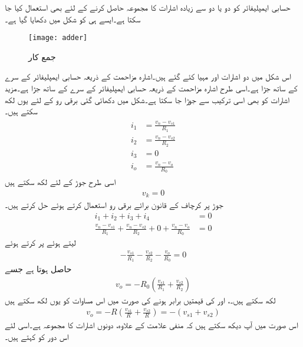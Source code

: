 
حسابی ایمپلیفائر کو دو یا دو سے زیادہ اشارات کا مجموعہ حاصل کرنے کے لئے بھی استعمال کیا جا سکتا ہے۔ایسے ہی   کو شکل  میں دکھایا گیا ہے۔
\begin{figure}
\centering
\texttt{[image: adder]}
\caption{جمع کار}
\label{شکل_جمع_کار}
\end{figure}
	اس شکل میں دو اشارات  اور  مہیا کئے گئے ہیں۔اشارہ  مزاحمت  کے ذریعہ حسابی ایمپلیفائر کے  سرے کے ساتھ جڑا ہے۔اسی طرح اشارہ  مزاحمت  کے ذریعہ حسابی ایمپلیفائر کے  سرے کے ساتھ جڑا ہے۔مزید اشارات کو بھی اسی ترکیب سے جوڑا جا سکتا ہے۔شکل میں دکھائی گئی برقی رو کے لئے یوں لکھ سکتے ہیں۔
\begin{gather}
\begin{aligned}
i_1 &=\frac{v_n-v_{s1}}{R_1} \\
i_2 &=\frac{v_n-v_{s2}}{R_2} \\
i_3&=0 \\
i_o &=\frac{v_n-v_o}{R_0}
\end{aligned}
\end{gather}
اسی طرح جوڑ  کے لئے لکھ سکتے ہیں
\begin{align}
v_k =0
\end{align}
جوڑ  پر کرچاف کے قانون برائے برقی رو استعمال کرتے ہوئے حل کرتے ہیں۔
\begin{align*}
i_1+i_2+i_3+i_4&=0 \\
\frac{v_n-v_{s1}}{R_1}+\frac{v_n-v_{s2}}{R_2}+0+\frac{v_n-v_o}{R_0}&=0
\end{align*}
 لیتے ہوئے  پر کرتے ہوئے
\begin{align*}
-\frac{v_{s1}}{R_1}-\frac{v_{s2}}{R_2}-\frac{v_o}{R_0}=0
\end{align*}
حاصل ہوتا ہے جسے
\begin{align}
v_o= -R_0 \left (\frac{v_{s1}}{R_1}+\frac{v_{s2}}{R_2}  \right)
\end{align}
لکھ سکتے ہیں۔، اور  کی قیمتیں برابر ہونے کی صورت میں اس مساوات کو یوں لکھ سکتے ہیں
\begin{align}
v_o = -R \left (\frac{v_{s1}}{R} +\frac{v_{s2}}{R}\right)=- \left (v_{s1}+v_{s2} \right )
\end{align}
اس صورت میں آپ دیکھ سکتے ہیں کہ منفی علامت کے علاوہ،   دونوں اشارات کا مجموعہ ہے۔اسی لئے اس دور کو   کہتے ہیں۔


